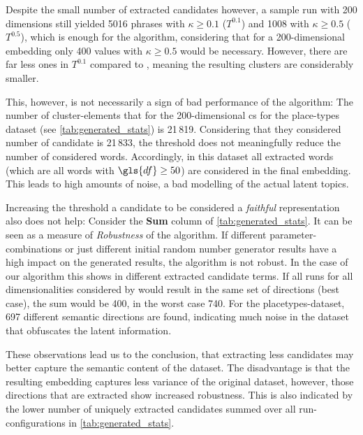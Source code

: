 
Despite the small number of extracted candidates however, a sample run with 200 dimensions still yielded 5016 phrases with $\kappa \geq 0.1$ ($T^{0.1}$) and 1008 with $\kappa \geq 0.5$ ($T^{0.5}$), which is enough for the algorithm, considering that for a 200-dimensional embedding only 400 values with $\kappa \geq 0.5$ would be necessary. However, there are far less ones in $T^{0.1}$ compared to \textcite{Derrac2015}, meaning the resulting clusters are considerably smaller. 

This, however, is not necessarily a sign of bad performance of the algorithm: The number of cluster-elements that \cite{Derrac2015} for the 200-dimensional \gls{cs} for the place-types dataset (see \autoref{tab:generated_stats}) is 21\,819. Considering that they considered  number of candidate is 21\,833, the threshold does not meaningfully reduce the number of considered words. Accordingly, in this dataset all extracted words (which are all words with $\gls{df} \geq 50$) are considered in the final embedding. This leads to high amounts of noise, \ie a bad modelling of the actual latent topics.

Increasing the threshold a candidate to be considered a \textit{faithful} representation also does not help: Consider the \textbf{Sum} column of \autoref{tab:generated_stats}. It can be seen as a measure of \textit{Robustness} of the algorithm. If different parameter-combinations or just different initial random number generator results have a high impact on the generated results, the algorithm is not robust. In the case of our algorithm this shows in different extracted candidate terms. If all runs for all dimensionalities considered by \textcite{Derrac2015} would result in the same set of directions (best case), the sum would be 400, in the worst case 740. For the placetypes-dataset, 697 different semantic directions are found, indicating much noise in the dataset that obfuscates the latent information.

These observations lead us to the conclusion, that extracting less candidates may better capture the semantic content of the dataset. The disadvantage is that the resulting embedding captures less variance of the original dataset, however, those directions that are extracted show increased robustness. This is also indicated by the lower number of uniquely extracted candidates summed over all run-configurations in \autoref{tab:generated_stats}. 

